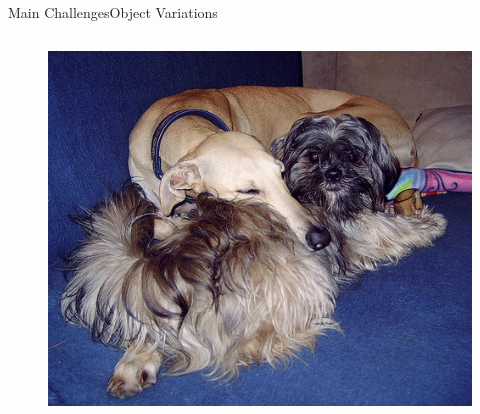 \begin{frame}{Main Challenges}{Object Variations}
\begin{columns}
        \begin{figure}
            \includegraphics[width=0.7 \textwidth]{figs/000078.jpg}
        \end{figure}

    \end{columns}
\end{frame}

